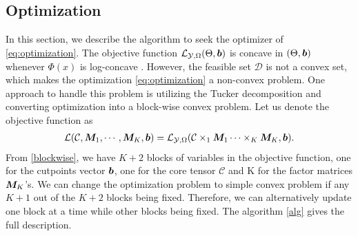 \documentclass{article}
\theoremstyle{plain}
\theoremstyle{definition}
\begin{document}
\subsection{Optimization}
In this section, we describe the algorithm to seek the optimizer of \eqref{eq:optimization}. The objective function $\mathcal{L}_{\mathcal{Y},\Omega}(\Theta,\bm{b})$ is concave in $(\Theta,\bm{b})$ whenever $\Phi(x)$ is log-concave \citep{McCullagh1980RegressionMF,Burridge1981ANO}.
However, the feasible set $\mathcal{D}$ is not a convex set, which makes the optimization \eqref{eq:optimization} a non-convex problem. One approach to handle this problem is utilizing the Tucker decomposition and converting optimization into a block-wise convex problem.
Let us denote the objective function as
\begin{equation}
    \label{blockwise}
    \begin{aligned}
         \mathcal{L}(\mathcal{C},\bm M_1,\cdots,\bm M_K,\bm{b}) = \mathcal{L}_{\mathcal{Y},\Omega}(\mathcal{C}\times_1\bm M_1\cdots\times_K\bm M_K,\bm{b}).
    \end{aligned}
\end{equation}
From \eqref{blockwise}, we have $K+2$ blocks of variables in the objective function, one for the cutpoints vector $\bm{b}$, one for the core tensor $\mathcal{C}$ and  K for the factor matrices $\bm M_K$'s.
We can change the optimization problem to simple convex problem if any $K+1$ out of the $K+2$ blocks being fixed. Therefore, we can alternatively update one block at a time while other blocks being fixed.
The algorithm \ref{alg} gives the full description.
\end{document}
